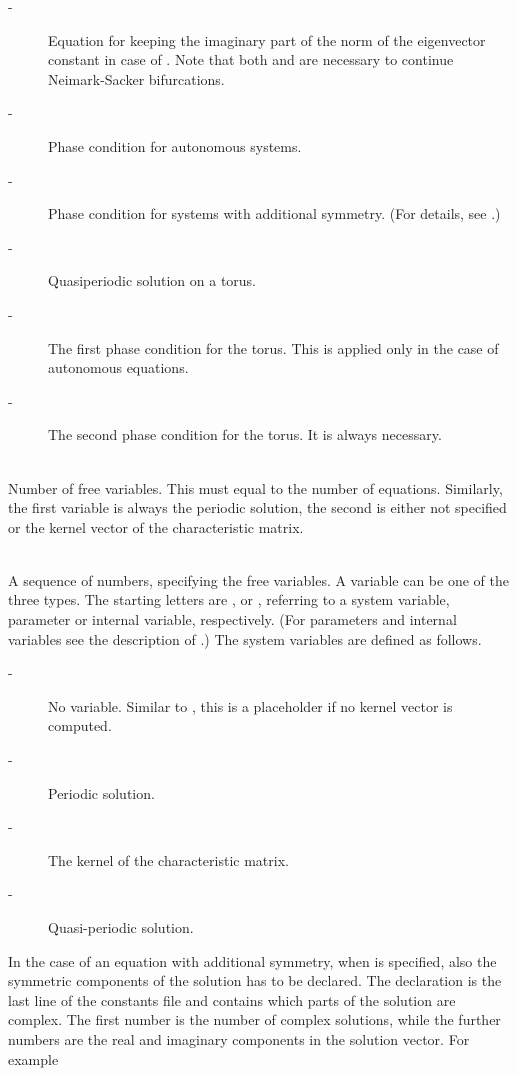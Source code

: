 \documentclass[10pt,a4paper]{ddedoc}
\begin{document}
\begin{description}
\begin{description}
\item[ -] Equation for keeping the imaginary part of the norm of the eigenvector constant in case of . Note that both  and  are necessary to continue Neimark-Sacker bifurcations.
\item[ -] Phase condition for autonomous systems.
\item[ -] Phase condition for systems with additional symmetry. (For details, see \cite{haegeman}.)
\item[ -] Quasiperiodic solution on a torus.
\item[ -] The first phase condition for the torus. This is applied only in the case of autonomous equations.
\item[ -] The second phase condition for the torus. It is always necessary.
\end{description}
\item[\funp{NVAR}] ~\\
	Number of free variables. This must equal to the number of equations. Similarly, the first variable is always the periodic solution, the second is either not specified or the kernel vector of the characteristic matrix.
\item[\funp{VAR}] ~\\
	A sequence of numbers, specifying the free variables. A variable can be one of the three types. The starting letters are ,  or , referring to a system variable, parameter or internal variable, respectively. (For parameters and internal variables see the description of .) The system variables are defined as follows.
\begin{description}
\item[ -] No variable. Similar to , this is a placeholder if no kernel vector is computed.
\item[ -] Periodic solution.
\item[ -] The kernel of the characteristic matrix.
\item[ -] Quasi-periodic solution.
\end{description}
In the case of an equation with additional symmetry, when  is specified, also the symmetric components of the solution has to be declared.
The declaration is the last line of the constants file and contains which parts of the solution are complex. The first number is the number of complex solutions,
while the further numbers are the real and imaginary components in the solution vector. For example

\end{description}
\end{document}
